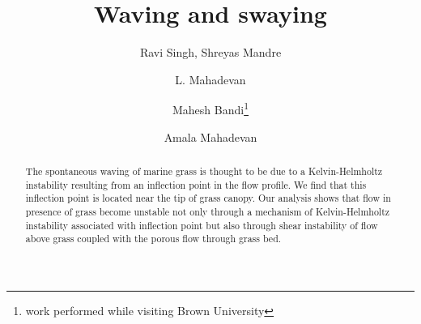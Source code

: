 \documentclass[aps,prl,twocolumn,showpacs,superscriptaddress,groupedaddress,10pt]{revtex4-1}  %
\begin{document}
\title{Waving and swaying}
\author{Ravi Singh, Shreyas Mandre}
\author{L. Mahadevan}
\author{Mahesh Bandi\footnote{work performed while visiting Brown University}}
\author{Amala Mahadevan}

\begin{abstract}


The spontaneous waving of marine grass is thought to be due to a Kelvin-Helmholtz instability resulting from an inflection point in the flow profile. We find that this inflection point
is located near the tip of grass canopy. Our analysis shows that flow in presence of grass become unstable not only through a mechanism of Kelvin-Helmholtz instability associated with 
inflection point but also through shear instability of flow above grass coupled with the porous flow through grass bed.
\end{abstract}
\maketitle
\end{document}
